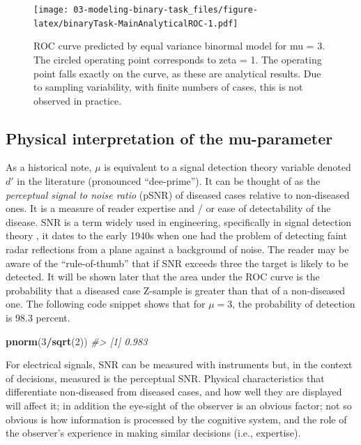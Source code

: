 \documentclass[
]{book}
\newenvironment{Shaded}{\begin{snugshade}}{\end{snugshade}}
\newcommand{\CommentTok}[1]{\textcolor[rgb]{0.56,0.35,0.01}{\textit{#1}}}
\newcommand{\DecValTok}[1]{\textcolor[rgb]{0.00,0.00,0.81}{#1}}
\newcommand{\KeywordTok}[1]{\textcolor[rgb]{0.13,0.29,0.53}{\textbf{#1}}}
\newcommand{\NormalTok}[1]{#1}
\newcommand{\OperatorTok}[1]{\textcolor[rgb]{0.81,0.36,0.00}{\textbf{#1}}}
\begin{document}
\begin{figure}
\centering
\texttt{[image: 03-modeling-binary-task\_files/figure-latex/binaryTask-MainAnalyticalROC-1.pdf]}
\caption{\label{fig:binaryTask-MainAnalyticalROC}ROC curve predicted by equal variance binormal model for mu = 3. The circled operating point corresponds to zeta = 1. The operating point falls exactly on the curve, as these are analytical results. Due to sampling variability, with finite numbers of cases, this is not observed in practice.}
\end{figure}

\hypertarget{physical-interpretation-of-the-mu-parameter}{%
\subsection{Physical interpretation of the mu-parameter}\label{physical-interpretation-of-the-mu-parameter}}

As a historical note, \(\mu\) is equivalent \citep{RN1318} to a signal detection theory variable denoted \(d'\) in the literature (pronounced ``dee-prime''). It can be thought of as the \emph{perceptual signal to noise ratio} (pSNR) of diseased cases relative to non-diseased ones. It is a measure of reader expertise and / or ease of detectability of the disease. SNR is a term widely used in engineering, specifically in signal detection theory \citep{RN298, RN346}, it dates to the early 1940s when one had the problem \citep{USAirForce1947} of detecting faint radar reflections from a plane against a background of noise. The reader may be aware of the ``rule-of-thumb'' that if SNR exceeds three the target is likely to be detected. It will be shown later that the area under the ROC curve is the probability that a diseased case Z-sample is greater than that of a non-diseased one. The following code snippet shows that for \(\mu = 3\), the probability of detection is 98.3 percent.

\begin{Shaded}
\begin{Highlighting}[]
\KeywordTok{pnorm}\NormalTok{(}\DecValTok{3}\OperatorTok{/}\KeywordTok{sqrt}\NormalTok{(}\DecValTok{2}\NormalTok{))}
\CommentTok{\#\textgreater{} [1] 0.983}
\end{Highlighting}
\end{Shaded}

For electrical signals, SNR can be measured with instruments but, in the context of decisions, measured is the perceptual SNR. Physical characteristics that differentiate non-diseased from diseased cases, and how well they are displayed will affect it; in addition the eye-sight of the observer is an obvious factor; not so obvious is how information is processed by the cognitive system, and the role of the observer's experience in making similar decisions (i.e., expertise).
\end{document}

